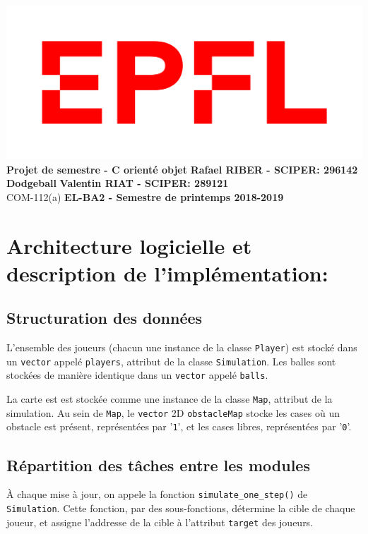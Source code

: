 \documentclass[a4paper, 11pt]{article}
\begin{document}
\noindent \includegraphics[scale=0.2]{figures/logo.png}\\
\large\textbf{Projet de semestre - C\raisebox{.5\height}{\scalebox{.5}{++}} orienté objet} \hfill \textbf{Rafael RIBER  - SCIPER: 296142} \\
\large\textbf{Dodgeball} \hfill \hfill \textbf{Valentin RIAT - SCIPER: 289121}\\
\normalsize COM-112(a) \hfill \textbf{EL-BA2 - Semestre de printemps 2018-2019}\\

\section{Architecture logicielle et description de l’implémentation:}

\subsection{Structuration des données}

L'ensemble des joueurs (chacun une instance de la classe \texttt{Player}) est stocké dans un \texttt{vector} appelé \texttt{players}, attribut de la classe \texttt{Simulation}. Les balles sont stockées de manière identique dans un \texttt{vector} appelé \texttt{balls}.

La carte est est stockée comme une instance de la classe \texttt{Map}, attribut de la simulation. Au sein de \texttt{Map}, le \texttt{vector} 2D \texttt{obstacleMap} stocke les cases où un obstacle est présent, représentées par '\texttt{1}', et les cases libres, représentées par '\texttt{0}'.

\subsection{Répartition des tâches entre les modules}

À chaque mise à jour, on appele la fonction \texttt{simulate\_one\_step()} de \texttt{Simulation}. Cette fonction, par des sous-fonctions, détermine la cible de chaque joueur, et assigne l'addresse de la cible à l'attribut \texttt{target} des joueurs. 
\end{document}
